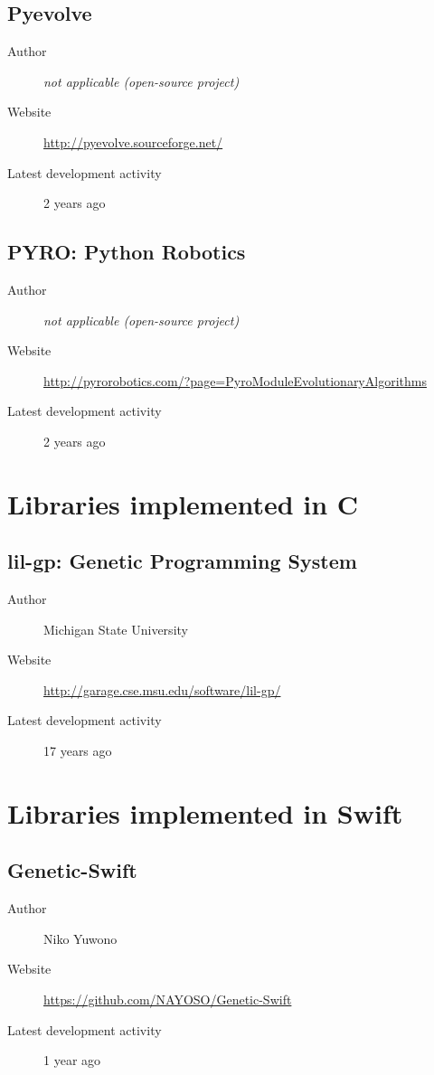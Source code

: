 \subsection*{Pyevolve}
\begin{description}
    \item[Author] \textit{not applicable (open-source project)}
    \item[Website] \url{http://pyevolve.sourceforge.net/}
    \item[Latest development activity] 2 years ago
\end{description}


\subsection*{PYRO: Python Robotics}
\begin{description}
    \item[Author] \textit{not applicable (open-source project)}
    \item[Website] \url{http://pyrorobotics.com/?page=PyroModuleEvolutionaryAlgorithms}
    \item[Latest development activity] 2 years ago
\end{description}


\section{Libraries implemented in C}
\subsection*{lil-gp: Genetic Programming System}
\begin{description}
    \item[Author] Michigan State University
    \item[Website] \url{http://garage.cse.msu.edu/software/lil-gp/}
    \item[Latest development activity] 17 years ago
\end{description}


\section{Libraries implemented in Swift}
\subsection*{Genetic-Swift}
\begin{description}
    \item[Author] Niko Yuwono
    \item[Website] \url{https://github.com/NAYOSO/Genetic-Swift}
    \item[Latest development activity] 1 year ago
\end{description}


